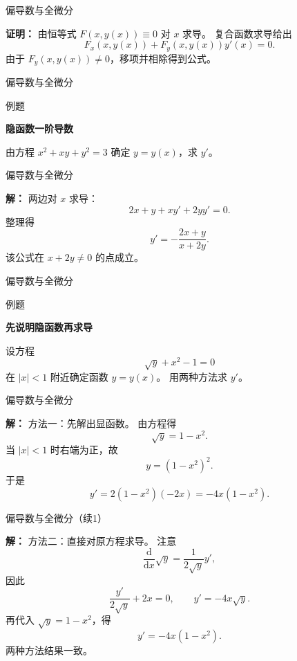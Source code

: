 \documentclass[aspectratio=169,10pt,fontset=fandol]{ctexbeamer}
\newcommand{\dd}{\mathrm{d}}
\begin{document}
\begin{frame}[t,fragile]{偏导数与全微分}
\footnotesize
{\footnotesize
\textbf{证明：}
由恒等式 $F(x,y(x))\equiv0$ 对 $x$ 求导。 复合函数求导给出
	\[
	F_x(x,y(x))+F_y(x,y(x))y'(x)=0.
	\]
	由于 $F_y(x,y(x))\neq0$，移项并相除得到公式。

}
\end{frame}
\begin{frame}[t,fragile]{偏导数与全微分}
\footnotesize
\begin{block}{例题}
{\footnotesize
\textbf{隐函数一阶导数}\par

	由方程 $x^2+xy+y^2=3$ 确定 $y=y(x)$，求 $y'$。

}
\end{block}
\end{frame}
\begin{frame}[t,fragile]{偏导数与全微分}
\footnotesize
{\footnotesize
\textbf{解：}
两边对 $x$ 求导：
	\[
	2x+y+xy'+2yy'=0.
	\]
	整理得
	\[
	y'=-\frac{2x+y}{x+2y}.
	\]
	该公式在 $x+2y\neq0$ 的点成立。

}
\end{frame}
\begin{frame}[t,fragile]{偏导数与全微分}
\footnotesize
\begin{block}{例题}
{\footnotesize
\textbf{先说明隐函数再求导}\par

	设方程
	\[
	\sqrt{y}+x^2-1=0
	\]
	在 $|x|<1$ 附近确定函数 $y=y(x)$。 用两种方法求 $y'$。

}
\end{block}
\end{frame}
\begin{frame}[t,fragile]{偏导数与全微分}
\footnotesize
{\footnotesize
\textbf{解：}
方法一：先解出显函数。 由方程得
	\[
	\sqrt{y}=1-x^2.
	\]
	当 $|x|<1$ 时右端为正，故
	\[
	y=(1-x^2)^2.
	\]
	于是
	\[
	y'=2(1-x^2)(-2x)=-4x(1-x^2).
	\]
	

}
\end{frame}
\begin{frame}[t,fragile]{偏导数与全微分（续1）}
\footnotesize
{\footnotesize
\textbf{解：}
	方法二：直接对原方程求导。 注意
	\[
	\frac{\dd}{\dd x}\sqrt{y}
	=\frac{1}{2\sqrt{y}}y',
	\]
	因此
	\[
	\frac{y'}{2\sqrt{y}}+2x=0,
	\qquad
	y'=-4x\sqrt{y}.
	\]
	再代入 $\sqrt{y}=1-x^2$，得
	\[
	y'=-4x(1-x^2).
	\]
	两种方法结果一致。

}
\end{frame}
\end{document}

